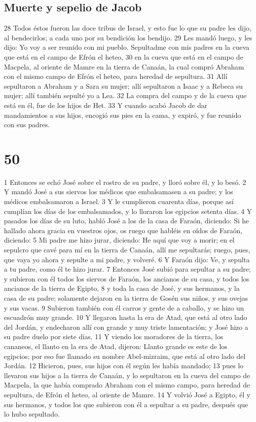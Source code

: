 \section*{Muerte y sepelio de Jacob}

28 Todos éstos fueron las doce tribus de Israel, y esto fue lo que su padre les dijo, al bendecirlos; a cada uno por su bendición los bendijo.
29 Les mandó luego, y les dijo: Yo voy a ser reunido con mi pueblo. Sepultadme con mis padres en la cueva que está en el campo de Efrón el heteo,
30 en la cueva que está en el campo de Macpela, al oriente de Mamre en la tierra de Canaán, la cual compró Abraham con el mismo campo de Efrón el heteo, para heredad de sepultura.
31 Allí sepultaron a Abraham y a Sara su mujer; allí sepultaron a Isaac y a Rebeca su mujer; allí también sepulté yo a Lea.
32 La compra del campo y de la cueva que está en él, fue de los hijos de Het.
33 Y cuando acabó Jacob de dar mandamientos a sus hijos, encogió sus pies en la cama, y expiró, y fue reunido con sus padres.

\chapter{50}

1 Entonces se echó José sobre el rostro de su padre, y lloró sobre él, y lo besó.
2 Y mandó José a sus siervos los médicos que embalsamasen a su padre; y los médicos embalsamaron a Israel.
3 Y le cumplieron cuarenta días, porque así cumplían los días de los embalsamados, y lo lloraron los egipcios setenta días.
4 Y pasados los días de su luto, habló José a los de la casa de Faraón, diciendo: Si he hallado ahora gracia en vuestros ojos, os ruego que habléis en oídos de Faraón, diciendo:
5 Mi padre me hizo jurar, diciendo: He aquí que voy a morir; en el sepulcro que cavé para mí en la tierra de Canaán, allí me sepultarás; ruego, pues, que vaya yo ahora y sepulte a mi padre, y volveré.
6 Y Faraón dijo: Ve, y sepulta a tu padre, como él te hizo jurar.
7 Entonces José subió para sepultar a su padre; y subieron con él todos los siervos de Faraón, los ancianos de su casa, y todos los ancianos de la tierra de Egipto,
8 y toda la casa de José, y sus hermanos, y la casa de su padre; solamente dejaron en la tierra de Gosén sus niños, y sus ovejas y sus vacas.
9 Subieron también con él carros y gente de a caballo, y se hizo un escuadrón muy grande.
10 Y llegaron hasta la era de Atad, que está al otro lado del Jordán, y endecharon allí con grande y muy triste lamentación; y José hizo a su padre duelo por siete días.
11 Y viendo los moradores de la tierra, los cananeos, el llanto en la era de Atad, dijeron: Llanto grande es este de los egipcios; por eso fue llamado su nombre Abel-mizraim, que está al otro lado del Jordán.
12 Hicieron, pues, sus hijos con él según les había mandado;
13 pues lo llevaron sus hijos a la tierra de Canaán, y lo sepultaron en la cueva del campo de Macpela, la que había comprado Abraham con el mismo campo, para heredad de sepultura, de Efrón el heteo, al oriente de Mamre.
14 Y volvió José a Egipto, él y sus hermanos, y todos los que subieron con él a sepultar a su padre, después que lo hubo sepultado.

